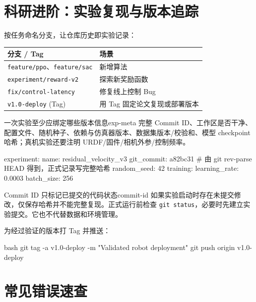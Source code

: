 \documentclass[12pt,a4paper]{ctexart}
\begin{document}
	\section{科研进阶：实验复现与版本追踪}

	按任务命名分支，让仓库历史即实验记录：

	\begin{tabularx}{\linewidth}{l X}
		\toprule
		\textbf{分支 / Tag} & \textbf{场景} \\
		\midrule
		\texttt{feature/ppo}、\texttt{feature/sac} & 新增算法 \\
		\texttt{experiment/reward-v2} & 探索新奖励函数 \\
		\texttt{fix/control-latency} & 修复线上控制 Bug \\
		\texttt{v1.0-deploy} (Tag) & 用 Tag 固定论文复现或部署版本 \\
		\bottomrule
	\end{tabularx}

	\begin{example}{一次实验至少应绑定哪些版本信息}{exp-meta}
		完整 Commit ID、工作区是否干净、配置文件、随机种子、依赖与仿真器版本、数据集版本/校验和、模型 checkpoint 哈希；真机实验还要注明 URDF/固件/相机外参/控制频率。
	\end{example}

	\begin{codeblock}{}
experiment:
  name: residual_velocity_v3
  git_commit: a82bc31      # 由 git rev-parse HEAD 得到，正式记录写完整哈希
  random_seed: 42
  training:
    learning_rate: 0.0003
    batch_size: 256
	\end{codeblock}

	\begin{warning}{Commit ID 只标记已提交的代码状态}{commit-id}
		如果实验启动时存在未提交修改，仅保存哈希并不能完整复现。正式运行前检查 \texttt{git status}，必要时先建立实验提交。它也不代替数据和环境管理。
	\end{warning}

	为经过验证的版本打 Tag 并推送：
	\begin{codeblock}{bash}
git tag -a v1.0-deploy -m "Validated robot deployment"
git push origin v1.0-deploy
	\end{codeblock}

	\section{常见错误速查}
\end{document}
